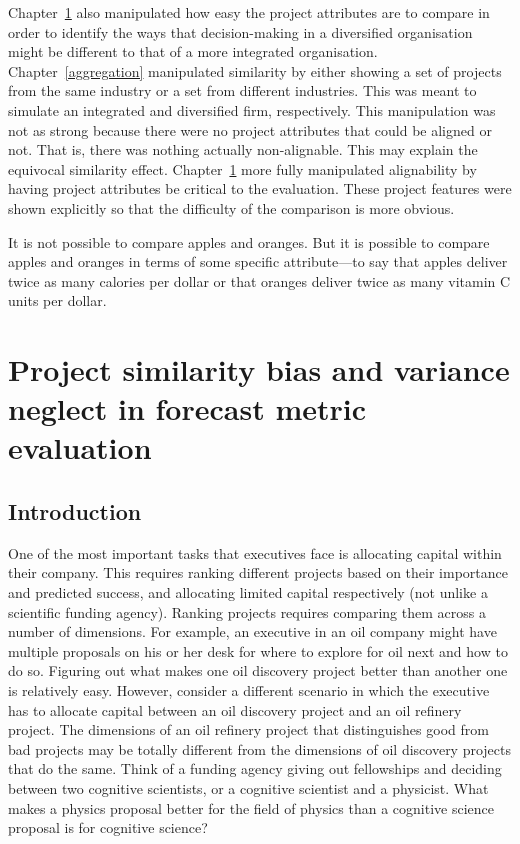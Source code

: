 \documentclass[a4paper, nobind, dvipsnames]{templates/ociamthesis}
\theoremstyle{definition}
\theoremstyle{definition}
\theoremstyle{definition}
\theoremstyle{definition}
\theoremstyle{remark}
\begin{document}
Chapter~\ref{alignment} also manipulated how easy the project attributes are to
compare in order to identify the ways that decision-making in a diversified
organisation might be different to that of a more integrated organisation.
Chapter~\ref{aggregation} manipulated similarity by either showing a set of
projects from the same industry or a set from different industries. This was
meant to simulate an integrated and diversified firm, respectively. This
manipulation was not as strong because there were no project attributes that
could be aligned or not. That is, there was nothing actually non-alignable. This
may explain the equivocal similarity effect. Chapter~\ref{alignment} more fully
manipulated alignability by having project attributes be critical to the
evaluation. These project features were shown explicitly so that the difficulty
of the comparison is more obvious.



\begin{savequote}
It is not possible to compare apples and oranges. But it is possible to
compare apples and oranges in terms of some specific attribute---to say
that apples deliver twice as many calories per dollar or that oranges
deliver twice as many vitamin C units per dollar.
\end{savequote}

\hypertarget{alignment}{%
\chapter{Project similarity bias and variance neglect in forecast metric evaluation}\label{alignment}}

\minitoc

\section{Introduction}

One of the most important tasks that executives face is allocating capital
within their company. This requires ranking different projects based on their
importance and predicted success, and allocating limited capital respectively
(not unlike a scientific funding agency). Ranking projects requires comparing
them across a number of dimensions. For example, an executive in an oil company
might have multiple proposals on his or her desk for where to explore for oil
next and how to do so. Figuring out what makes one oil discovery project better
than another one is relatively easy. However, consider a different scenario in
which the executive has to allocate capital between an oil discovery project
and an oil refinery project. The dimensions of an oil refinery project that
distinguishes good from bad projects may be totally different from the
dimensions of oil discovery projects that do the same. Think of a funding agency
giving out fellowships and deciding between two cognitive scientists, or a
cognitive scientist and a physicist. What makes a physics proposal better for
the field of physics than a cognitive science proposal is for cognitive science?
\end{document}

